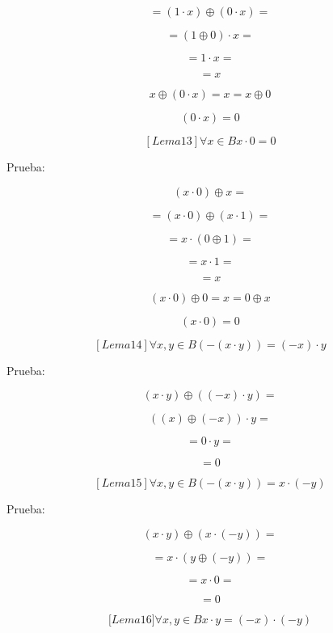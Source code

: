 \begin{enumerate}
\begin{enumerate}
\begin{enumerate}
      \[{= \left( {1 \cdot x} \right)} \oplus {\left( {0 \cdot x} \right) =}\]

      \[{= {\left( {1 \oplus 0} \right) \cdot x}} =\]

      \[{= {1 \cdot x}} =\]

      \[= x\]

      \[x \oplus {{\left( {0 \cdot x} \right) = x} = x} \oplus 0\]

      \[\left( {0 \cdot x} \right) = 0\]

      \[\left\lbrack {{Lema}13} \right\rbrack\forall{x \in B}{{x \cdot 0} = 0}\]

      Prueba:

      \[\left( {x \cdot 0} \right) \oplus {x =}\]

      \[{= \left( {x \cdot 0} \right)} \oplus {\left( {x \cdot 1} \right) =}\]

      \[{= {x \cdot \left( {0 \oplus 1} \right)}} =\]

      \[{= {x \cdot 1}} =\]

      \[= x\]

      \[\left( {x \cdot 0} \right) \oplus {{0 = x} = 0} \oplus x\]

      \[\left( {x \cdot 0} \right) = 0\]

      \[\left\lbrack {{Lema}14} \right\rbrack\forall x,{y \in B}{\left( {- \left( {x \cdot y} \right)} \right) = {\left( {- x} \right) \cdot y}}\]

      Prueba:

      \[\left( {x \cdot y} \right) \oplus {\left( {\left( {- x} \right) \cdot y} \right) =}\]

      \[{\left( {(x) \oplus \left( {- x} \right)} \right) \cdot y} =\]

      \[{= {0 \cdot y}} =\]

      \[= 0\]

      \[\left\lbrack {{Lema}15} \right\rbrack\forall x,{y \in B}{\left( {- \left( {x \cdot y} \right)} \right) = {x \cdot \left( {- y} \right)}}\]

      Prueba:

      \[\left( {x \cdot y} \right) \oplus {\left( {x \cdot \left( {- y} \right)} \right) =}\]

      \[{= {x \cdot \left( {y \oplus \left( {- y} \right)} \right)}} =\]

      \[{= {x \cdot 0}} =\]

      \[= 0\]

      \[{\lbrack{{Lema}16}\rbrack}\forall x,{y \in B}{{x \cdot y} = {\left( {- x} \right) \cdot \left( {- y} \right)}}\]


\end{enumerate}
\end{enumerate}
\end{enumerate}
